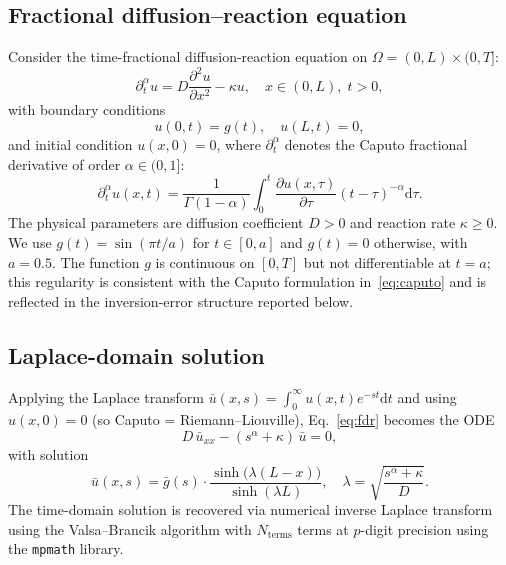 \documentclass[11pt]{article}
\newcommand{\diff}{\mathrm{d}}
\begin{document}
\subsection{Fractional diffusion--reaction equation}
\label{sec:problem}

Consider the time-fractional diffusion-reaction equation on $\Omega = (0, L) \times (0, T]$:
\begin{equation}
\label{eq:fdr}
\partial_t^\alpha u = D \frac{\partial^2 u}{\partial x^2} - \kappa u, \quad x \in (0, L),\; t > 0,
\end{equation}
with boundary conditions \cite{podlubny1999fractional}
\begin{equation}
u(0, t) = g(t), \quad u(L, t) = 0,
\end{equation}
and initial condition $u(x, 0) = 0$, where $\partial_t^\alpha$ denotes the Caputo fractional derivative of order $\alpha \in (0, 1]$:
\begin{equation}
\label{eq:caputo}
\partial_t^\alpha u(x,t) = \frac{1}{\Gamma(1-\alpha)} \int_0^t \frac{\partial u(x,\tau)}{\partial \tau} (t - \tau)^{-\alpha} \diff\tau.
\end{equation}
The physical parameters are diffusion coefficient $D > 0$ and reaction rate $\kappa \geq 0$. We use $g(t) = \sin(\pi t / a)$ for $t \in [0, a]$ and $g(t) = 0$ otherwise, with $a = 0.5$. The function $g$ is continuous on $[0, T]$ but not differentiable at $t = a$; this regularity is consistent with the Caputo formulation in~\eqref{eq:caputo} and is reflected in the inversion-error structure reported below.

\subsection{Laplace-domain solution}
\label{sec:laplace}

Applying the Laplace transform $\bar{u}(x,s) = \int_0^\infty u(x,t) e^{-st}\diff t$ and using $u(x,0) = 0$ (so Caputo = Riemann--Liouville), Eq.~\eqref{eq:fdr} becomes the ODE
\begin{equation}
D\, \bar{u}_{xx} - (s^\alpha + \kappa)\, \bar{u} = 0,
\end{equation}
with solution
\begin{equation}
\label{eq:laplace_solution}
\bar{u}(x, s) = \bar{g}(s) \cdot \frac{\sinh\bigl(\lambda(L-x)\bigr)}{\sinh(\lambda L)}, \quad \lambda = \sqrt{\frac{s^\alpha + \kappa}{D}}.
\end{equation}
The time-domain solution is recovered via numerical inverse Laplace transform using the Valsa--Brancik algorithm \cite{valsa2001approximate} with $N_{\mathrm{terms}}$ terms at $p$-digit precision using the \texttt{mpmath} library.
\end{document}
